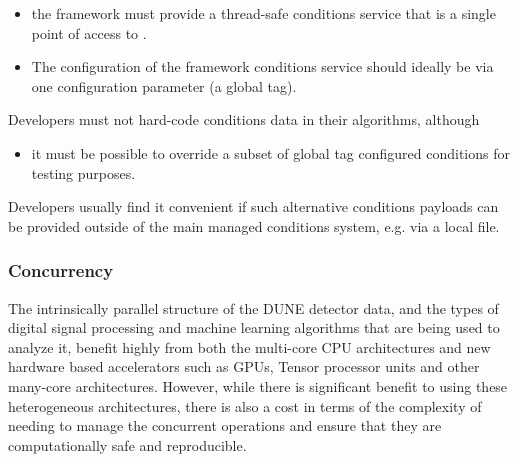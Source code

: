 \documentclass[../main-v1.tex]{subfiles}
\begin{document}
\begin{itemize}
\item the framework must provide a thread-safe conditions service that is a single point of access to .  

\item The configuration of the framework conditions service should ideally be via one configuration parameter (a global tag). 
\end{itemize}

Developers must not hard-code conditions data in their algorithms, although 

\begin{itemize}
\item it must be possible to override a subset of global tag configured conditions for testing purposes.  
\end{itemize}

Developers usually find it convenient if such alternative conditions payloads can be provided outside of the main managed conditions system, e.g. via a local file.

\subsubsection{Concurrency} %


The intrinsically parallel structure of the DUNE detector data, and the types of digital signal processing and machine learning algorithms that are being used to analyze it, benefit highly from both the multi-core CPU architectures and new hardware based accelerators such as GPUs, Tensor processor units and other many-core architectures.  However, while there is significant benefit to using these heterogeneous architectures, there is also a cost in terms of the complexity of needing to manage the concurrent operations and ensure that they are computationally safe and reproducible.
\end{document}
